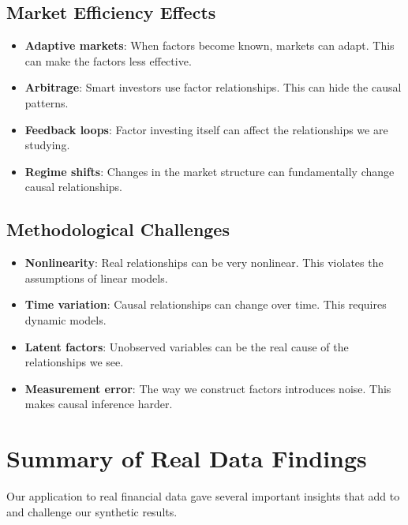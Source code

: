 \subsection{Market Efficiency Effects}
\begin{itemize}
    \item \textbf{Adaptive markets}: When factors become known, markets can adapt. This can make the factors less effective.
    \item \textbf{Arbitrage}: Smart investors use factor relationships. This can hide the causal patterns.
    \item \textbf{Feedback loops}: Factor investing itself can affect the relationships we are studying.
    \item \textbf{Regime shifts}: Changes in the market structure can fundamentally change causal relationships.
\end{itemize}

\subsection{Methodological Challenges}
\begin{itemize}
    \item \textbf{Nonlinearity}: Real relationships can be very nonlinear. This violates the assumptions of linear models.
    \item \textbf{Time variation}: Causal relationships can change over time. This requires dynamic models.
    \item \textbf{Latent factors}: Unobserved variables can be the real cause of the relationships we see.
    \item \textbf{Measurement error}: The way we construct factors introduces noise. This makes causal inference harder.
\end{itemize}

\section{Summary of Real Data Findings}

Our application to real financial data gave several important insights that add to and challenge our synthetic results.

